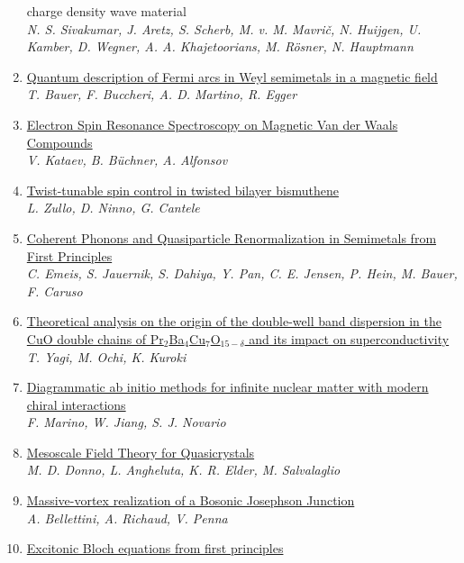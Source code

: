 \documentclass{article}
\begin{document}
\begin{enumerate}
{{  charge density wave material}}\\
{\small\color{blue}\textsl{N. S. Sivakumar, J. Aretz, S. Scherb, M. v. M. Mavrič, N. Huijgen, U. Kamber, D. Wegner, A. A. Khajetoorians, M. Rösner, N. Hauptmann}}
\item\href{http://arxiv.org/abs/2407.17218v1}{\textsf{Quantum description of Fermi arcs in Weyl semimetals in a magnetic field}}\\
{\small\color{blue}\textsl{T. Bauer, F. Buccheri, A. D. Martino, R. Egger}}
\item\href{http://arxiv.org/abs/2407.17173v1}{\textsf{Electron Spin Resonance Spectroscopy on Magnetic Van der Waals Compounds}}\\
{\small\color{blue}\textsl{V. Kataev, B. Büchner, A. Alfonsov}}
\item\href{http://arxiv.org/abs/2407.17124v1}{\textsf{Twist-tunable spin control in twisted bilayer bismuthene}}\\
{\small\color{blue}\textsl{L. Zullo, D. Ninno, G. Cantele}}
\item\href{http://arxiv.org/abs/2407.17118v1}{\textsf{Coherent Phonons and Quasiparticle Renormalization in Semimetals from
  First Principles}}\\
{\small\color{blue}\textsl{C. Emeis, S. Jauernik, S. Dahiya, Y. Pan, C. E. Jensen, P. Hein, M. Bauer, F. Caruso}}
\item\href{http://arxiv.org/abs/2407.17102v1}{\textsf{Theoretical analysis on the origin of the double-well band dispersion in
  the CuO double chains of Pr$_2$Ba$_4$Cu$_7$O$_{15-δ}$ and its impact on
  superconductivity}}\\
{\small\color{blue}\textsl{T. Yagi, M. Ochi, K. Kuroki}}
\item\href{http://arxiv.org/abs/2407.17098v1}{\textsf{Diagrammatic ab initio methods for infinite nuclear matter with modern
  chiral interactions}}\\
{\small\color{blue}\textsl{F. Marino, W. Jiang, S. J. Novario}}
\item\href{http://arxiv.org/abs/2407.17091v1}{\textsf{Mesoscale Field Theory for Quasicrystals}}\\
{\small\color{blue}\textsl{M. D. Donno, L. Angheluta, K. R. Elder, M. Salvalaglio}}
\item\href{http://arxiv.org/abs/2407.17080v1}{\textsf{Massive-vortex realization of a Bosonic Josephson Junction}}\\
{\small\color{blue}\textsl{A. Bellettini, A. Richaud, V. Penna}}
\item\href{http://arxiv.org/abs/2407.17077v1}{\textsf{Excitonic Bloch equations from first principles}}\\

\end{enumerate}
\end{document}
